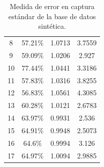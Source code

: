 \begin{table}[ht!]
\begin{tabular}{@{}cccc@{}}
8                           & 57.21\%                                                            & 1.0713                                                             & 3.7559                                                           \\
9                           & 59.09\%                                                            & 1.0206                                                             & 2.927                                                            \\
10                          & 77.44\%                                                            & 1.0441                                                             & 3.3186                                                           \\
11                          & 57.83\%                                                            & 1.0316                                                             & 3.8255                                                           \\
12                          & 56.83\%                                                            & 1.0561                                                             & 4.3085                                                           \\
13                          & 60.28\%                                                            & 1.0121                                                             & 2.6783                                                           \\
14                          & 63.97\%                                                            & 0.9931                                                             & 2.536                                                            \\
15                          & 64.91\%                                                            & 0.9948                                                             & 2.5073                                                           \\
16                          & 64.6\%                                                             & 0.9994                                                             & 3.126                                                            \\
17                          & 64.97\%                                                            & 1.0094                                                             & 2.9885                                                           \\ \bottomrule
\end{tabular}
\caption{Medida de error en captura estándar de la base de datos sintética.}
\label{tablaerrorseg}
\end{table}

